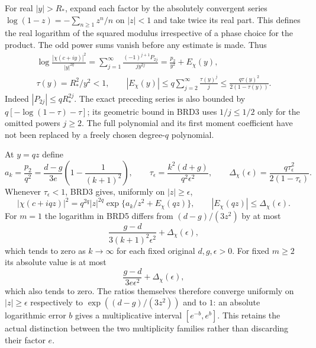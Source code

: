 \documentclass[11pt,a4paper]{article}
\begin{document}
For real $|y|>R_*$, expand each factor by the absolutely convergent
series $\log(1-z)=-\sum_{n\geq1}z^n/n$ on $|z|<1$ and take
twice its real part. This defines the real logarithm of the squared
modulus irrespective of a phase choice for the product. The odd
power sums vanish before any estimate is made. Thus
\[
\begin{gathered}
 \log\frac{|\chi(c+iy)|^2}{|y|^{2q}}
   =\sum_{j=1}^{\infty}\frac{(-1)^{j+1}P_{2j}}{j y^{2j}}
   =\frac{p_2}{y^2}+E_\chi(y),\\
 \tau(y)=R_*^2/y^2<1,\qquad
 |E_\chi(y)|\leq
 q\sum_{j=2}^{\infty}\frac{\tau(y)^j}{j}
 \leq\frac{q\tau(y)^2}{2(1-\tau(y))}.
\end{gathered}\tag{BRD3}
\]
Indeed $|P_{2j}|\leq qR_*^{2j}$. The exact preceding series is
also bounded by $q[-\log(1-\tau)-\tau]$; its geometric bound in
BRD3 uses $1/j\leq1/2$ only for the omitted powers $j\geq2$.
The full polynomial and its first moment coefficient have not been
replaced by a freely chosen degree-$q$ polynomial.

At $y=qz$ define
\[
 a_k=\frac{p_2}{q^2}
  =\frac{d-g}{3e}\left(1-\frac1{(k+1)^2}\right),\qquad
 \tau_\epsilon=\frac{k^2(d+g)}{q^2\epsilon^2},\qquad
 \Delta_\chi(\epsilon)=
       \frac{q\tau_\epsilon^2}{2(1-\tau_\epsilon)}.
\tag{BRD4}
\]
Whenever $\tau_\epsilon<1$, BRD3 gives, uniformly on
$|z|\geq\epsilon$,
\[
 |\chi(c+iqz)|^2=q^{2q}|z|^{2q}
      \exp\{a_k/z^2+E_\chi(qz)\},
 \qquad |E_\chi(qz)|\leq\Delta_\chi(\epsilon).
\tag{BRD5}
\]
For $m=1$ the logarithm in BRD5 differs from
$(d-g)/(3z^2)$ by at most
\[
 \frac{g-d}{3(k+1)^2\epsilon^2}+\Delta_\chi(\epsilon),
\tag{BRD6}
\]
which tends to zero as $k\to\infty$ for each fixed original
$d,g,\epsilon>0$. For fixed $m\geq2$ its absolute value is
at most
\[
 \frac{g-d}{3e\epsilon^2}+\Delta_\chi(\epsilon),
\tag{BRD7}
\]
which also tends to zero. The ratios themselves therefore converge
uniformly on $|z|\geq\epsilon$ respectively to
$\exp((d-g)/(3z^2))$ and to $1$: an absolute logarithmic error
$b$ gives a multiplicative interval $[e^{-b},e^b]$.
This retains the actual distinction between the two multiplicity
families rather than discarding their factor $e$.
\end{document}
